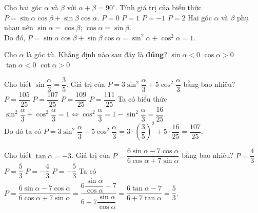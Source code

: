 \begin{ex}%
	Cho hai góc $\alpha $ và $\beta $ với $\alpha +\beta =90^\circ $. Tính giá trị của biểu thức \break $P=\sin \alpha \cos \beta +\sin \beta \cos \alpha $.
	\choice
	{$P=0$}
	{\True $P=1$}
	{$P=-1$}
	{$P=2$}
	\loigiai
	{Hai góc $\alpha $ và $\beta $ phụ nhau nên $\sin \alpha =\cos \beta$; $\cos \alpha =\sin \beta $.\\
		Do đó, $P=\sin \alpha \cos \beta +\sin \beta \cos \alpha =\sin ^2\alpha +\cos^2\alpha =1$.}
\end{ex}

\begin{ex}%
	Cho $\alpha $ là góc tù. Khẳng định nào sau đây là \textbf{đúng}?
	\choice
	{$\sin \alpha <0$}
	{$\cos \alpha >0$}
	{\True $\tan \alpha <0$}
	{$\cot \alpha >0$} 
	\loigiai{}
\end{ex}

\begin{ex}%
	Cho biết $\sin \dfrac{\alpha }{3}=\dfrac{3}{5}$. Giá trị của $P=3\sin ^2\dfrac{\alpha }{3}+5\cos^2\dfrac{\alpha }{3}$ bằng bao nhiêu?
	\choice
	{$P=\dfrac{105}{25}$}
	{\True $P=\dfrac{107}{25}$}
	{$P=\dfrac{109}{25}$}
	{$P=\dfrac{111}{25}$}
	\loigiai
	{Ta có biểu thức $\sin ^2\dfrac{\alpha }{3}+\cos^2\dfrac{\alpha }{3}=1\Leftrightarrow \cos^2\dfrac{\alpha }{3}=1-\sin ^2\dfrac{\alpha }{3}=\dfrac{16}{25}$.\\
		Do đó ta có $P=3\sin ^2\dfrac{\alpha }{3}+5\cos^2\dfrac{\alpha }{3}=3\cdot {(\dfrac{3}{5} )}^2+5\cdot \dfrac{16}{25}=\dfrac{107}{25}$.}
\end{ex}
\begin{ex}%
	Cho biết $\tan \alpha =-3$. Giá trị của $P=\dfrac{6\sin \alpha -7\cos \alpha }{6\cos \alpha +7\sin \alpha }$ bằng bao nhiêu?
	\choice
	{$P=\dfrac{4}{3}$}
	{\True $P=\dfrac{5}{3}$}
	{$P=-\dfrac{4}{3}$}
	{$P=-\dfrac{5}{3}$}
	\loigiai
	{Ta có $P=\dfrac{6\sin \alpha -7\cos \alpha }{6\cos \alpha +7\sin \alpha }=\dfrac{6\dfrac{\sin \alpha }{\cos \alpha }-7}{6+7\dfrac{\sin \alpha }{\cos \alpha }}=\dfrac{6\tan \alpha -7}{6+7\tan \alpha }=\dfrac{5}{3}$.}
\end{ex}

